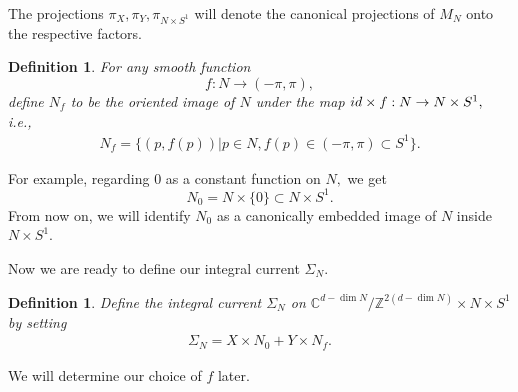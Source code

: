 \documentclass[11pt,a4paper]{amsart}
\numberwithin{equation}{section}
\newcommand{\Si}{\Sigma}
\newcommand{\s}{\subset}
\newcommand{\cz}{\C^{d-\dim N}/\Z^{2(d-\dim N)}}
\newcommand{\Z}{\mathbb{Z}}
\newcommand{\C}{\mathbb{C}}
\newcommand{\id}{\textnormal{id}}
\theoremstyle{plain}
\newtheorem{defn}[exam]{Definition}
\theoremstyle{definition}
\numberwithin{equation}{subsection}
\begin{document}
The projections $\pi_{X},\pi_Y,\pi_{N\times S^1}$ will denote the canonical projections of $M_N$ onto the respective factors.
\begin{defn}
	For any smooth function $$f:N\to (-\pi,\pi),$$ 
	define $N_f$ to be the oriented image of $N$ under the map $\id\times f:N\to N\times S^1,$ i.e.,
	\begin{align*}
		N_f=\{(p,f(p))|p\in N,f(p)\in(-\pi,\pi)\s S^1\}.
	\end{align*}
\end{defn}
For example, regarding $0$ as a constant function on $N,$ we get $$N_0=N\times\{0\}\s N\times S^1.$$ From now on, we will identify $N_0$ as a canonically embedded image of $N$ inside $N\times S^1.$


Now we are ready to define our integral current $\Si_N.$
\begin{defn}\label{defnsn}
	Define the integral current $\Si_N$ on $\cz\times N\times S^1$ by setting
	\begin{align*}
		\Si_N=X\times N_0+Y\times N_f.
	\end{align*}
\end{defn}
We will determine our choice of $f$ later. 
\end{document}
